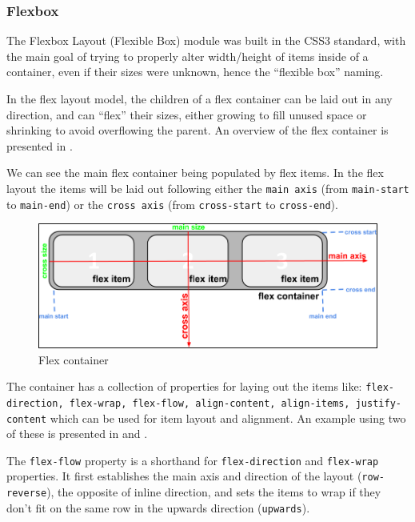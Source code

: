 



\subsubsection{Flexbox}
\label{sub-sub-sec:flexbox}

The Flexbox Layout (Flexible Box) module was built in the CSS3 standard, with the main goal of trying to properly alter width/height of items inside of a container, even if their sizes were unknown, hence the ``flexible box'' naming.

In the flex layout model, the children of a flex container can be laid out in any direction, and can “flex” their sizes, either growing to fill unused space or shrinking to avoid overflowing the parent\cite{flexbox}. An overview of the flex container is presented in .

We can see the main flex container being populated by flex items. In the flex layout the items will be laid out following either the \texttt{main axis} (from \texttt{main-start} to \texttt{main-end}) or the \texttt{cross axis} (from \texttt{cross-start} to \texttt{cross-end}).


\begin{figure}[H]
	\centering
	\includegraphics[scale=0.4]{src/img/flexbox-remake.png}
	\caption{Flex container\label{img:flexbox}}
\end{figure}

The container has a collection of properties for laying out the items like: \texttt{flex-direction, flex-wrap, flex-flow, align-content, align-items, justify-content} which can be used for item layout and alignment. An example using two of these is presented in  and .




The \texttt{flex-flow} property is a shorthand for \texttt{flex-direction} and \texttt{flex-wrap} properties. It first establishes the main axis and direction of the layout (\texttt{row-reverse}), the opposite of inline direction, and sets the items to wrap if they don't fit on the same row in the upwards direction (\texttt{upwards}).